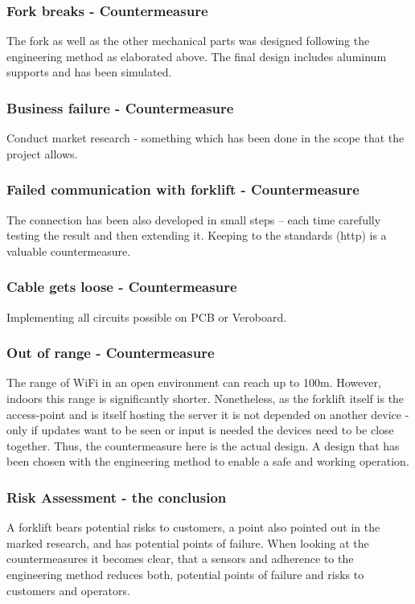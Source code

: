 \documentclass[../report.tex]{subfiles}
\begin{document}
\subsubsection{Fork breaks - Countermeasure}
The fork as well as the other mechanical parts was designed following the engineering method 
as elaborated above. The final design includes aluminum supports and has been simulated. 
\subsubsection{Business failure - Countermeasure}
Conduct market research - something which has been done in the scope that the project allows.

\subsubsection{Failed communication with forklift - Countermeasure}
The connection has been also developed in small steps – each time carefully testing the result
and then extending it. Keeping to the standards (http) is a valuable countermeasure. 
\subsubsection{Cable gets loose - Countermeasure}
Implementing all circuits possible on PCB or Veroboard.

\subsubsection{Out of range - Countermeasure}
The range of WiFi in an open environment can reach up to 100m. However, indoors this range is significantly
shorter. Nonetheless, as the forklift itself is the access-point and is itself hosting the server
it is not depended on another device - only if updates want to be seen or input is needed the devices need to be 
close together. Thus, the countermeasure here is the actual design. A design that has been chosen with the engineering
method to enable a safe and working operation.

\subsubsection{Risk Assessment - the conclusion}
A forklift bears potential risks to customers, a point also pointed out in the marked research, and has potential points of failure. 
When looking at the countermeasures it becomes clear, that a sensors and adherence to the engineering
method reduces both, potential points of failure and risks to customers and operators.
\end{document}
